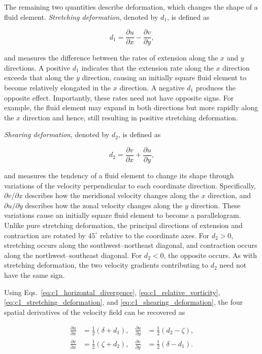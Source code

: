 \documentclass[10pt,twocolumn]{memoir}
\begin{document}
The remaining two quantities describe deformation, which changes the shape of a fluid element. \textit{Stretching deformation}, denoted by $d_1$, is defined as

\begin{equation}
    d_1=\frac{\partial u}{\partial x}-\frac{\partial v}{\partial y},
\label{eq:c1_stretching_deformation}
\end{equation}

and measures the difference between the rates of extension along the $x$ and $y$ directions. A positive $d_1$ indicates that the extension rate along the $x$ direction exceeds that along the $y$ direction, causing an initially square fluid element to become relatively elongated in the $x$ direction. A negative $d_1$ produces the opposite effect. Importantly, these rates need not have opposite signs. For example, the fluid element may expand in both directions but more rapidly along the $x$ direction and hence, still resulting in positive stretching deformation.

\textit{Shearing deformation}, denoted by $d_2$, is defined as

\begin{equation}
    d_2=\frac{\partial v}{\partial x}+\frac{\partial u}{\partial y},
\label{eq:c1_shearing_deformation}
\end{equation}

and measures the tendency of a fluid element to change its shape through variations of the velocity perpendicular to each coordinate direction. Specifically, $\partial v/\partial x$ describes how the meridional velocity changes along the $x$ direction, and $\partial u/\partial y$ describes how the zonal velocity changes along the $y$ direction. These variations cause an initially square fluid element to become a parallelogram. Unlike pure stretching deformation, the principal directions of extension and contraction are rotated by $45^\circ$ relative to the coordinate axes. For $d_2>0$, stretching occurs along the southwest--northeast diagonal, and contraction occurs along the northwest--southeast diagonal. For $d_2<0$, the opposite occurs. As with stretching deformation, the two velocity gradients contributing to $d_2$ need not have the same sign.

Using Eqs.~\ref{eq:c1_horizontal_divergence}, \ref{eq:c1_relative_vorticity}, \ref{eq:c1_stretching_deformation}, and \ref{eq:c1_shearing_deformation}, the four spatial derivatives of the velocity field can be recovered as

\begin{equation}
\begin{aligned}
    \frac{\partial u}{\partial x} &= \frac{1}{2}(\delta+d_1),&
    \frac{\partial u}{\partial y} &= \frac{1}{2}(d_2-\zeta),\\
    \frac{\partial v}{\partial x} &= \frac{1}{2}(\zeta+d_2),&
    \frac{\partial v}{\partial y} &= \frac{1}{2}(\delta-d_1).
\end{aligned}
\label{eq:c1_kinematic_derivatives}
\end{equation}
\end{document}
